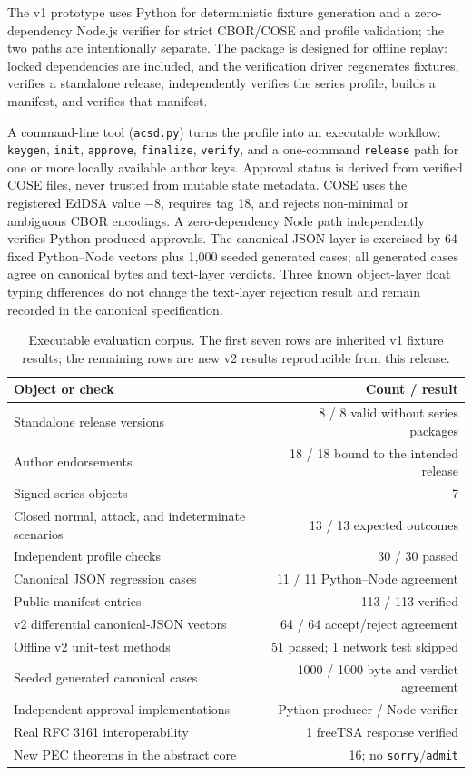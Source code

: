 \documentclass[11pt]{article}
\begin{document}
The v1 prototype uses Python for deterministic fixture generation and a zero-dependency Node.js verifier for strict CBOR/COSE and profile validation; the two paths are intentionally separate. The package is designed for offline replay: locked dependencies are included, and the verification driver regenerates fixtures, verifies a standalone release, independently verifies the series profile, builds a manifest, and verifies that manifest.

A command-line tool (\texttt{acsd.py}) turns the profile into an executable workflow: \texttt{keygen}, \texttt{init}, \texttt{approve}, \texttt{finalize}, \texttt{verify}, and a one-command \texttt{release} path for one or more locally available author keys. Approval status is derived from verified COSE files, never trusted from mutable state metadata. COSE uses the registered EdDSA value $-8$, requires tag 18, and rejects non-minimal or ambiguous CBOR encodings. A zero-dependency Node path independently verifies Python-produced approvals. The canonical JSON layer is exercised by 64 fixed Python--Node vectors plus 1,000 seeded generated cases; all generated cases agree on canonical bytes and text-layer verdicts. Three known object-layer float typing differences do not change the text-layer rejection result and remain recorded in the canonical specification.

\begin{table}[t]
\centering
\caption{Executable evaluation corpus. The first seven rows are inherited v1 fixture results; the remaining rows are new v2 results reproducible from this release.}
\begin{tabular}{lr}
\toprule
Object or check & Count / result \\
\midrule
Standalone release versions & 8 / 8 valid without series packages \\
Author endorsements & 18 / 18 bound to the intended release \\
Signed series objects & 7 \\
Closed normal, attack, and indeterminate scenarios & 13 / 13 expected outcomes \\
Independent profile checks & 30 / 30 passed \\
Canonical JSON regression cases & 11 / 11 Python--Node agreement \\
Public-manifest entries & 113 / 113 verified \\
v2 differential canonical-JSON vectors & 64 / 64 accept/reject agreement \\
Offline v2 unit-test methods & 51 passed; 1 network test skipped \\
Seeded generated canonical cases & 1000 / 1000 byte and verdict agreement \\
Independent approval implementations & Python producer / Node verifier \\
Real RFC 3161 interoperability & 1 freeTSA response verified \\
New PEC theorems in the abstract core & 16; no \texttt{sorry}/\texttt{admit} \\
\bottomrule
\end{tabular}
\end{table}
\end{document}
